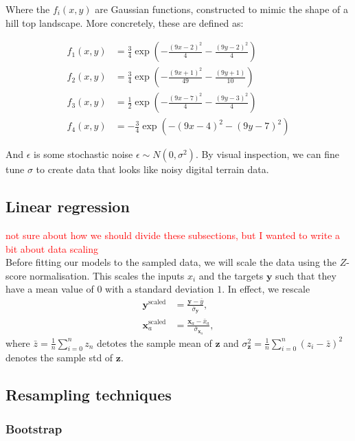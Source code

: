 \documentclass[twocolumn,english,notitlepage]{article}
\newcommand{\comment}[1]{\textcolor{red}{#1}\\}
\renewcommand{\vec}[1]{\boldsymbol{#1}}
\newcommand{\pclosed}[1]{\left(#1\right)}
\newcommand{\exptext}[1]{\operatorname{exp}\pclosed{#1}}
\begin{document}
    Where the $f_i(x,y)$ are Gaussian functions, constructed to mimic the shape of a hill top landscape. More concretely, these are defined as:

    \begin{align} \nonumber
        f_1(x,y) &= \frac{3}{4}\exptext{ -\frac{(9x-2)^2}{4} - \frac{(9y-2)^2}{4} } \nonumber \\
        f_2(x,y) &= \frac{3}{4}\exptext{ -\frac{(9x+1)^2}{49} - \frac{(9y+1)}{10}} \nonumber \\
        f_3(x,y) &= \frac{1}{2}\exptext{ -\frac{(9x-7)^2}{4} - \frac{(9y-3)^2}{4}} \nonumber \\
        f_4(x,y) &= -\frac{3}{4}\exptext{ -(9x-4)^2 - (9y-7)^2} \nonumber
    \end{align}

    And $\epsilon$ is some stochastic noise $\epsilon \sim N(0,\sigma^2)$. By visual inspection, we can fine tune $\sigma$ to create data that looks like noisy digital terrain data.
    
    \subsection{Linear regression}
    \comment{not sure about how we should divide these subsections, but I wanted to write a bit about data scaling}
    Before fitting our models to the sampled data, we will scale the data using the $Z$-score normalisation. This scales the inputs $x_i$ and the targets $\vec{y}$ such that they have a mean value of $0$ with a standard deviation $1$. In effect, we rescale
    \begin{subequations}
        \begin{align}
            \vec{y}^\text{scaled} &= \frac{\vec{y}-\bar{y}}{\bar{\sigma}_{\vec{y}}}, \\
            \vec{x}_a^\text{scaled} &= \frac{\vec{x}_a - \bar{x}_a}{\bar{\sigma}_{\vec{x}_a}},
        \end{align}
    \end{subequations}
    where $\bar{z} = \frac{1}{n} \sum_{i=0}^n z_n$ detotes the sample mean of $\vec{z}$ and $\sigma_{\vec{z}}^2 = \frac{1}{n} \sum_{i=0}^n {(z_i-\bar{z})}^2$ denotes the sample std of $\vec{z}$.

    \subsection{Resampling techniques}

        \subsubsection*{Bootstrap}
\end{document}
